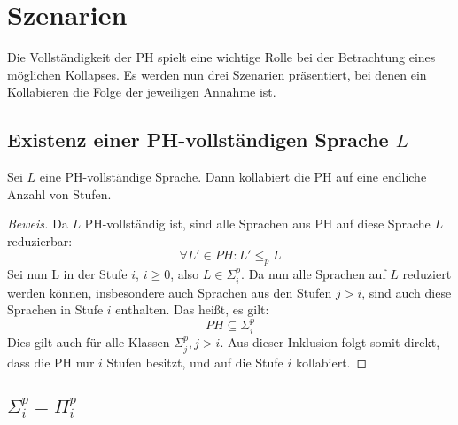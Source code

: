\section{Szenarien} \label{section: Kollabieren der PH}
Die Vollständigkeit der PH spielt eine wichtige Rolle bei der Betrachtung eines möglichen Kollapses. Es werden nun drei Szenarien präsentiert, bei denen ein Kollabieren die Folge der jeweiligen Annahme ist.
\subsection{Existenz einer PH-vollständigen Sprache $L$}\label{subsection: PH-vollst. Sprache}
\begin{theorem}
    Sei $L$ eine PH-vollständige Sprache. Dann kollabiert die PH auf eine endliche Anzahl von Stufen. 
\end{theorem}

\begin{proof}[Beweis] \cite[S.98]{arora_computational_2009}
    Da $L$ PH-vollständig ist, sind alle Sprachen aus PH auf diese Sprache $L$ reduzierbar:
    $$
    \forall L' \in PH: L' \leq_p L
    $$
    Sei nun L in der Stufe $i$, $i \geq 0$, also $L \in \Sigma^p_i$. Da nun alle Sprachen auf $L$ reduziert werden können, insbesondere
    auch Sprachen aus den Stufen $j > i$, sind auch diese Sprachen in Stufe $i$ enthalten.
    Das heißt, es gilt:
    \begin{equation}
        PH \subseteq \Sigma^p_i
    \end{equation}
    Dies gilt auch für alle Klassen $\Sigma^p_j, j> i$.
    Aus dieser Inklusion folgt somit direkt, dass die PH nur $i$ Stufen besitzt, und auf die Stufe $i$ kollabiert.
\end{proof}

\subsection{$\Sigma^p_i = \Pi^p_i$}

